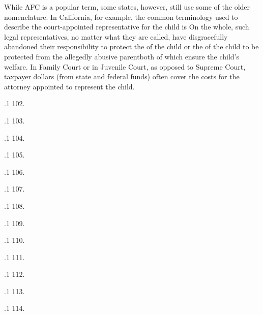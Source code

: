 \documentclass[11pt, twoside]{article}
\begin{document}
{{{While AFC is a popular term, some states, however, still use some of the older
nomenclature. In California, for example, the common terminology used to describe the court-appointed representative for the child is  On
the whole, such legal representatives, no matter what they are called, have disgracefully abandoned their responsibility to protect the  of the
child or the  of the child to be protected from the allegedly abusive
parent\mdash{}both of which ensure the child’s welfare. In Family Court or in Juvenile Court, as opposed to Supreme Court, taxpayer dollars (from state and
federal funds) often cover the costs for the attorney appointed to represent the
child.}
}%

\p.1{%
102.
}%

\p.1{%
103.
}%

\p.1{%
104.
}%

\p.1{%
105.
}%

\p.1{%
106.
}%

\p.1{%
107.
}%

\p.1{%
108.
}%

\p.1{%
109.
}%

\p.1{%
110.
}%

\p.1{%
111.
}%

\p.1{%
112.
}%

\p.1{%
113.
}%

\p.1{%
114.
}%

}
\end{document}
